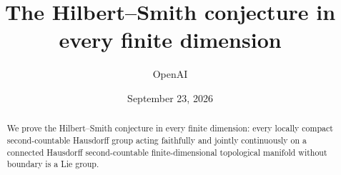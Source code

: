 \documentclass[11pt]{article}
\title{The Hilbert--Smith conjecture in every finite dimension}
\author{OpenAI}
\date{September 23, 2026}
\makeatletter
\numberwithin{equation}{section}
\theoremstyle{definition}
\theoremstyle{remark}
\renewcommand{\maketitle}{%
  \begin{center}{\LARGE\@title\par}\vspace{1em}{\large\@author\par}\vspace{.5em}{\@date\par}\end{center}
  \vspace{.5em}%
}
\makeatother
\begin{document}
\maketitle
\begin{abstract}
We prove the Hilbert--Smith conjecture in every finite dimension: every
locally compact second-countable Hausdorff group acting faithfully and
jointly continuously on a connected Hausdorff second-countable
finite-dimensional topological manifold without boundary is a Lie group.
\end{abstract}
\begingroup
\small
\setlength{\baselineskip}{0.92\baselineskip}
\tableofcontents
\endgroup
\clearpage






\appendix



\end{document}
